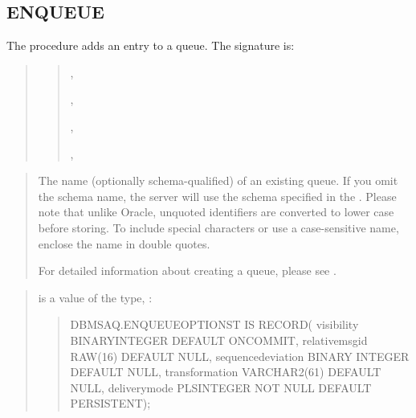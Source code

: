 \documentclass[letterpaper,10pt,english,openany,oneside]{sphinxmanual}
\begin{document}
\newpage


\subsection{ENQUEUE}
\label{\detokenize{enqueue:enqueue}}\label{\detokenize{enqueue::doc}}
The  procedure adds an entry to a queue. The signature is:
\begin{quote}

\begin{quote}

,

,

,

,

\end{quote}
\end{quote}


\begin{quote}

The name (optionally schema-qualified) of an existing queue. If you
omit the schema name, the server will use the schema specified in
the . Please note that unlike Oracle, unquoted
identifiers are converted to lower case before storing. To include
special characters or use a case-sensitive name, enclose the name in
double quotes.

For detailed information about creating a queue, please see
.
\end{quote}

\begin{quote}

 is a value of the type, :
\begin{quote}

%
\begin{sphinxVerbatim}[commandchars=\\\{\}]
DBMS\PYGZus{}AQ.ENQUEUE\PYGZus{}OPTIONS\PYGZus{}T IS RECORD(
  visibility BINARY\PYGZus{}INTEGER DEFAULT ON\PYGZus{}COMMIT,
  relative\PYGZus{}msgid RAW(16) DEFAULT NULL,
  sequence\PYGZus{}deviation BINARY INTEGER DEFAULT NULL,
  transformation VARCHAR2(61) DEFAULT NULL,
  delivery\PYGZus{}mode PLS\PYGZus{}INTEGER NOT NULL DEFAULT PERSISTENT);
\end{sphinxVerbatim}
\end{quote}
\end{quote}
\end{document}
